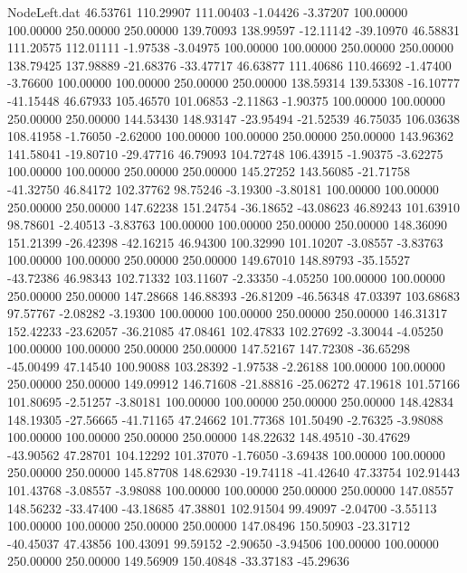 \begin{filecontents}{NodeLeft.dat}
  46.53761  110.29907  111.00403    -1.04426   -3.37207  100.00000  100.00000  250.00000  250.00000  139.70093  138.99597  -12.11142  -39.10970
  46.58831  111.20575  112.01111    -1.97538   -3.04975  100.00000  100.00000  250.00000  250.00000  138.79425  137.98889  -21.68376  -33.47717
  46.63877  111.40686  110.46692    -1.47400   -3.76600  100.00000  100.00000  250.00000  250.00000  138.59314  139.53308  -16.10777  -41.15448
  46.67933  105.46570  101.06853    -2.11863   -1.90375  100.00000  100.00000  250.00000  250.00000  144.53430  148.93147  -23.95494  -21.52539
  46.75035  106.03638  108.41958    -1.76050   -2.62000  100.00000  100.00000  250.00000  250.00000  143.96362  141.58041  -19.80710  -29.47716
  46.79093  104.72748  106.43915    -1.90375   -3.62275  100.00000  100.00000  250.00000  250.00000  145.27252  143.56085  -21.71758  -41.32750
  46.84172  102.37762   98.75246    -3.19300   -3.80181  100.00000  100.00000  250.00000  250.00000  147.62238  151.24754  -36.18652  -43.08623
  46.89243  101.63910   98.78601    -2.40513   -3.83763  100.00000  100.00000  250.00000  250.00000  148.36090  151.21399  -26.42398  -42.16215
  46.94300  100.32990  101.10207    -3.08557   -3.83763  100.00000  100.00000  250.00000  250.00000  149.67010  148.89793  -35.15527  -43.72386
  46.98343  102.71332  103.11607    -2.33350   -4.05250  100.00000  100.00000  250.00000  250.00000  147.28668  146.88393  -26.81209  -46.56348
  47.03397  103.68683   97.57767    -2.08282   -3.19300  100.00000  100.00000  250.00000  250.00000  146.31317  152.42233  -23.62057  -36.21085
  47.08461  102.47833  102.27692    -3.30044   -4.05250  100.00000  100.00000  250.00000  250.00000  147.52167  147.72308  -36.65298  -45.00499
  47.14540  100.90088  103.28392    -1.97538   -2.26188  100.00000  100.00000  250.00000  250.00000  149.09912  146.71608  -21.88816  -25.06272
  47.19618  101.57166  101.80695    -2.51257   -3.80181  100.00000  100.00000  250.00000  250.00000  148.42834  148.19305  -27.56665  -41.71165
  47.24662  101.77368  101.50490    -2.76325   -3.98088  100.00000  100.00000  250.00000  250.00000  148.22632  148.49510  -30.47629  -43.90562
  47.28701  104.12292  101.37070    -1.76050   -3.69438  100.00000  100.00000  250.00000  250.00000  145.87708  148.62930  -19.74118  -41.42640
  47.33754  102.91443  101.43768    -3.08557   -3.98088  100.00000  100.00000  250.00000  250.00000  147.08557  148.56232  -33.47400  -43.18685
  47.38801  102.91504   99.49097    -2.04700   -3.55113  100.00000  100.00000  250.00000  250.00000  147.08496  150.50903  -23.31712  -40.45037
  47.43856  100.43091   99.59152    -2.90650   -3.94506  100.00000  100.00000  250.00000  250.00000  149.56909  150.40848  -33.37183  -45.29636

\end{filecontents}

